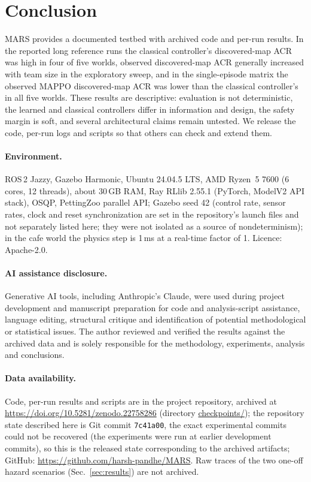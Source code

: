 \documentclass[conference]{IEEEtran}
\begin{document}
\section{Conclusion}
MARS provides a documented testbed with archived code and per-run results. In the
reported long reference runs the classical controller's discovered-map ACR
was high in four of five worlds, observed discovered-map ACR generally increased with
team size in the exploratory sweep, and in the single-episode matrix the
observed MAPPO discovered-map ACR was lower than the classical controller's in all five
worlds. These results are descriptive: evaluation is not deterministic, the
learned and classical controllers differ in information and design, the safety
margin is soft, and several architectural claims remain untested. We release
the code, per-run logs and scripts so that others can check and extend them.

\paragraph*{Environment.} ROS\,2 Jazzy, Gazebo Harmonic, Ubuntu 24.04.5 LTS, AMD Ryzen~5 7600 (6 cores, 12 threads), about 30\,GB RAM, Ray RLlib 2.55.1 (PyTorch, ModelV2 API stack), OSQP, PettingZoo parallel API; Gazebo seed 42 (control rate, sensor rates, clock and reset synchronization are set in the repository's launch files and not separately listed here; they were not isolated as a source of nondeterminism); in the cafe world the physics step is 1\,ms at a real-time factor of 1. Licence: Apache-2.0.

\paragraph*{AI assistance disclosure.} Generative AI tools, including Anthropic's Claude, were used during project development and manuscript preparation for code and analysis-script assistance, language editing, structural critique and identification of potential methodological or statistical issues. The author reviewed and verified the results against the archived data and is solely responsible for the methodology, experiments, analysis and conclusions.

\paragraph*{Data availability.} Code, per-run results and scripts are in the
project repository, archived at \url{https://doi.org/10.5281/zenodo.22758286}
(directory \url{checkpoints/}); the repository state described here is Git commit \texttt{7c41a00}, the exact experimental commits could not be recovered (the experiments were run at earlier development commits), so this is the released state corresponding to the archived artifacts; GitHub: \url{https://github.com/harsh-pandhe/MARS}. Raw traces of the two one-off hazard scenarios (Sec.~\ref{sec:results}) are not archived.



\end{document}
